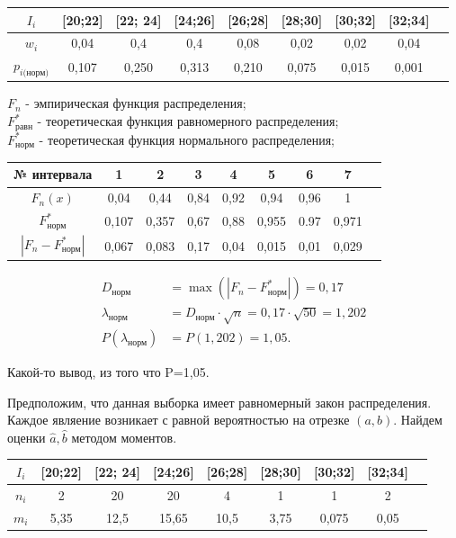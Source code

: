 \documentclass[utf8, a4paper, 14pt, russian, oneside]{book}
\begin{document}
\begin{table}[h!]
    \centering
    \begin{tabular}{|c|c|c|c|c|c|c|c|c|}
        \hline
        $I_i$  & [20;22] & [22; 24] & [24;26] & [26;28] & [28;30] & [30;32] & [32;34] \\
        \hline
        $w_i$ & 0,04 & 0,4 & 0,4 & 0,08 & 0,02 & 0,02 & 0,04 \\
        \hline
        $p_{i\text{(норм)}}$ & 0,107 & 0,250 & 0,313 & 0,210 & 0,075 & 0,015 & 0,001 \\
        \hline
    \end{tabular}
\end{table}

$F_n$ - эмпирическая функция распределения;\\
$F^*_{\text{равн}}$ - теоретическая функция равномерного распределения;\\
$F^*_{\text{норм}}$ - теоретическая функция нормального распределения;

\begin{table}[h!]
    \centering
    \begin{tabular}{|c|c|c|c|c|c|c|c|c|}
        \hline
        № интервала & 1 & 2 & 3 & 4 & 5 & 6 & 7 \\
        \hline
        $F_n(x)$ & 0,04 & 0,44 & 0,84 & 0,92 & 0,94 & 0,96 & 1 \\
        \hline
        $F^*_{\text{норм}}$ & 0,107 & 0,357 & 0,67 & 0,88 & 0,955 & 0.97 & 0,971 \\
        \hline
        $| F_n - F^*_{\text{норм}} |$ & 0,067 & 0,083 & 0,17 & 0,04 & 0,015 & 0,01 & 0,029\\
        \hline
    \end{tabular}
\end{table}
\begin{align*}
    D_{\text{норм}} &= \max{(|F_n - F^*_{\text{норм}}|)} = 0,17 \\
    \lambda_{\text{норм}} &= D_{\text{норм}} \cdot \sqrt{n} = 0,17 \cdot \sqrt{50} = 1,202\\
    P(\lambda_{\text{норм}}) &= P(1,202) = 1,05.
\end{align*}

Какой-то вывод, из того что P=1,05.
\newpage


Предположим, что данная выборка имеет равномерный закон распределения.
Каждое являение возникает с равной вероятностью на отрезке $(a, b)$. Найдем оценки $\hat a, \hat b$ методом моментов.
\begin{table}[h!]
    \centering
    \begin{tabular}{|c|c|c|c|c|c|c|c|c|}
        \hline
        $I_i$  & [20;22] & [22; 24] & [24;26] & [26;28] & [28;30] & [30;32] & [32;34] \\
        \hline
        $n_i$ & 2 & 20 & 20 & 4 & 1 & 1 & 2 \\
        \hline
        $m_i$ & 5,35 & 12,5 & 15,65 & 10,5 & 3,75 & 0,075 & 0,05\\
        \hline
    \end{tabular}
\end{table}
\end{document}
